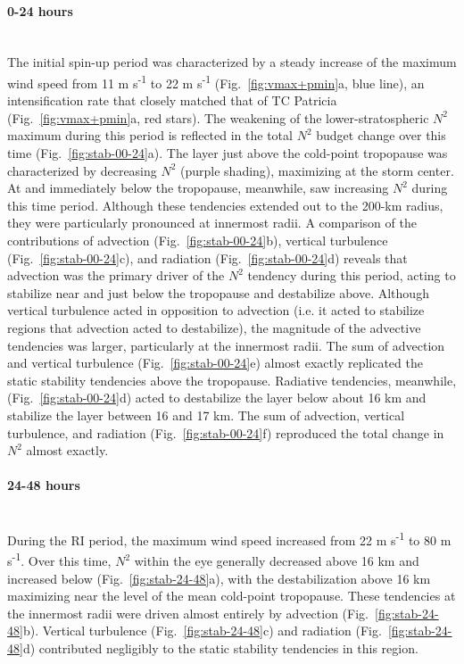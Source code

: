 \documentclass{ametsoc}
\begin{document}
\paragraph{0-24 hours}\mbox{}\\
\indent The initial spin-up period was characterized by a steady increase of the maximum wind speed from 11 m s\textsuperscript{-1} to 22 m s\textsuperscript{-1} (Fig.~\ref{fig:vmax+pmin}a, blue line), an intensification rate that closely matched that of TC Patricia (Fig.~\ref{fig:vmax+pmin}a, red stars).
The weakening of the lower-stratospheric $N^2$ maximum during this period is reflected in the total $N^2$ budget change over this time (Fig.~\ref{fig:stab-00-24}a).
The layer just above the cold-point tropopause was characterized by decreasing $N^2$ (purple shading), maximizing at the storm center.
At and immediately below the tropopause, meanwhile, saw increasing $N^2$ during this time period.
Although these tendencies extended out to the 200-km radius, they were particularly pronounced at innermost radii.
A comparison of the contributions of advection (Fig.~\ref{fig:stab-00-24}b), vertical turbulence (Fig.~\ref{fig:stab-00-24}c), and radiation (Fig.~\ref{fig:stab-00-24}d) reveals that advection was the primary driver of the $N^2$ tendency during this period, acting to stabilize near and just below the tropopause and destabilize above.
Although vertical turbulence acted in opposition to advection (i.e. it acted to stabilize regions that advection acted to destabilize), the magnitude of the advective tendencies was larger, particularly at the innermost radii.
The sum of advection and vertical turbulence (Fig.~\ref{fig:stab-00-24}e) almost exactly replicated the static stability tendencies above the tropopause.
Radiative tendencies, meanwhile, (Fig.~\ref{fig:stab-00-24}d) acted to destabilize the layer below about 16 km and stabilize the layer between 16 and 17 km.
The sum of advection, vertical turbulence, and radiation (Fig.~\ref{fig:stab-00-24}f) reproduced the total change in $N^2$ almost exactly.

\paragraph{24-48 hours}\mbox{}\\
\indent During the RI period, the maximum wind speed increased from 22 m s\textsuperscript{-1} to 80 m s\textsuperscript{-1}.
Over this time, $N^2$ within the eye generally decreased above 16 km and increased below (Fig.~\ref{fig:stab-24-48}a), with the destabilization above 16 km maximizing near the level of the mean cold-point tropopause.
These tendencies at the innermost radii were driven almost entirely by advection (Fig.~\ref{fig:stab-24-48}b).
Vertical turbulence (Fig.~\ref{fig:stab-24-48}c) and radiation (Fig.~\ref{fig:stab-24-48}d) contributed negligibly to the static stability tendencies in this region.
\end{document}
